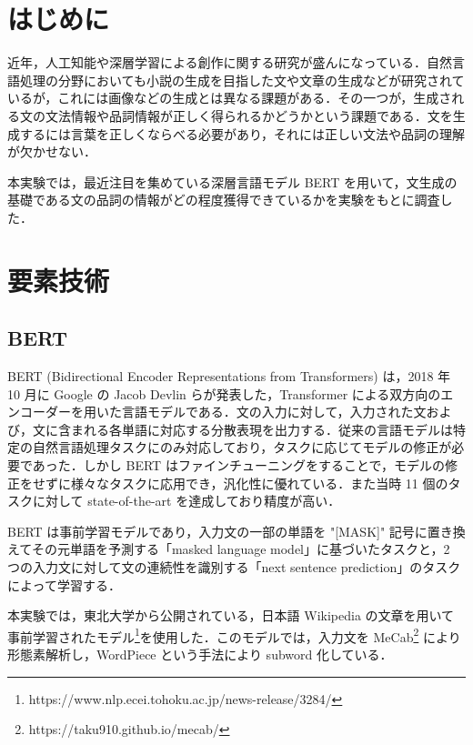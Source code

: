 \documentclass[twocolumn]{jarticle}
\begin{document}

\section{はじめに}
近年，人工知能や深層学習による創作に関する研究が盛んになっている．自然言語処理の分野においても小説の生成を目指した文や文章の生成などが研究されているが，これには画像などの生成とは異なる課題がある．その一つが，生成される文の文法情報や品詞情報が正しく得られるかどうかという課題である．文を生成するには言葉を正しくならべる必要があり，それには正しい文法や品詞の理解が欠かせない．\par
本実験では，最近注目を集めている深層言語モデル BERT を用いて，文生成の基礎である文の品詞の情報がどの程度獲得できているかを実験をもとに調査した．


\section{要素技術}

  \subsection{BERT}
BERT (Bidirectional Encoder Representations from Transformers)\cite{DBLP} は，2018 年 10 月に Google の Jacob Devlin らが発表した，Transformer による双方向のエンコーダーを用いた言語モデルである．文の入力に対して，入力された文および，文に含まれる各単語に対応する分散表現を出力する．従来の言語モデルは特定の自然言語処理タスクにのみ対応しており，タスクに応じてモデルの修正が必要であった．しかし BERT はファインチューニングをすることで，モデルの修正をせずに様々なタスクに応用でき，汎化性に優れている．また当時 11 個のタスクに対して state-of-the-art を達成しており精度が高い．\par
BERT は事前学習モデルであり，入力文の一部の単語を "[MASK]" 記号に置き換えてその元単語を予測する「masked language model」に基づいたタスクと，2 つの入力文に対して文の連続性を識別する「next sentence prediction」のタスクによって学習する．\par
本実験では，東北大学から公開されている，日本語 Wikipedia の文章を用いて事前学習されたモデル\footnote{https://www.nlp.ecei.tohoku.ac.jp/news-release/3284/}を使用した．このモデルでは，入力文を MeCab\footnote{https://taku910.github.io/mecab/} により形態素解析し，WordPiece という手法により subword 化している．
\end{document}
